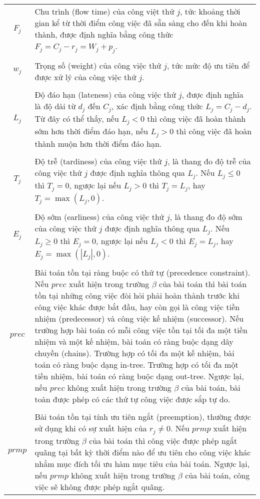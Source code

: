 \documentclass[12pt,a4paper]{report}
\begin{document}
\begin{tabularx}{\linewidth}{ c  X }
		\\
		$F_j$ & Chu trình (flow time) của công việt thứ $j$, tức khoảng thời gian kể từ thời điểm công việc đã sẵn sàng cho đến khi hoàn thành, được định nghĩa bằng công thức $F_j = C_j - r_j = W_j + p_j$. \\
		\\
		$w_j$ & Trọng số (weight) của công việc thứ $j$, tức mức độ ưu tiên để được xử lý của công việc thứ $j$. \\
		\\
		$L_j$ & Độ đáo hạn (lateness) của công việc thứ $j$, được định nghĩa là độ dài từ $d_j$ đến $C_j$, xác định bằng công thức $L_j=C_j-d_j$. Từ đây có thể thấy, nếu $L_j < 0$ thì công việc đã hoàn thành sớm hơn thời điểm đáo hạn, nếu $L_j > 0$ thì công việc đã hoàn thành muộn hơn thời điểm đáo hạn. \\
		\\
		$T_j$ & Độ trễ (tardiness) của công việc thứ $j$, là thang đo độ trễ của công việc thứ $j$ được định nghĩa thông qua $L_j$. Nếu $L_j \leq 0$ thì $T_j=0$, ngược lại nếu $L_j > 0$ thì $T_j = L_j$, hay $T_j=\max (L_j,0)$. \\
		\\
		$E_j$ & Độ sớm (earliness) của công việc thứ $j$, là thang đo độ sớm của công việc thứ $j$ được định nghĩa thông qua $L_j$. Nếu $L_j \geq 0$ thì $E_j=0$, ngược lại nếu $L_j < 0$ thì $E_j = L_j$, hay $E_j=\max (|L_j|,0)$. \\
		\\
		$prec$ & Bài toán tồn tại ràng buộc có thứ tự (precedence constraint). Nếu $prec$ xuất hiện trong trường $\beta$ của bài toán thì bài toán tồn tại những công việc đòi hỏi phải hoàn thành trước khi công việc khác được bắt đầu, hay còn gọi là công việc tiền nhiệm (predecessor) và công việc kế nhiệm (successor). Nếu trường hợp bài toán có mỗi công việc tồn tại tối đa một tiền nhiệm và một kế nhiệm, bài toán có ràng buộc dạng dây chuyền (chains). Trường hợp có tối đa một kế nhiệm, bài toán có ràng buộc dạng in-tree. Trường hợp có tối đa một tiền nhiệm, bài toán có ràng buộc dạng out-tree. Ngược lại, nếu $prec$ không xuất hiện trong trường $\beta$ của bài toán, bài toàn được phép có các thứ tự công việc được sắp tự do. \\
		\\
		$prmp$ & Bài toán tồn tại tính ưu tiên ngắt (preemption), thường được sử dụng khi có sự xuất hiện của $r_j \neq 0$. Nếu $prmp$ xuất hiện trong trường $\beta$ của bài toán thì công việc được phép ngắt quãng tại bất kỳ thời điểm nào để ưu tiên cho công việc khác nhằm mục đích tối ưu hàm mục tiêu của bài toán. Ngược lại, nếu $prmp$ không xuất hiện trong trường $\beta$ của bài toán, công việc sẽ không được phép ngắt quãng. \\
	\end{tabularx}
\newpage
{} 
\end{document}
